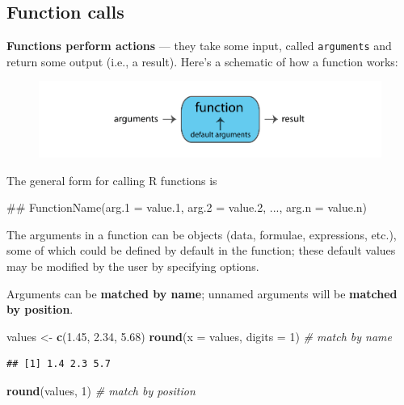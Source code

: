 \documentclass[]{book}
\newenvironment{Shaded}{\begin{snugshade}}{\end{snugshade}}
\newcommand{\KeywordTok}[1]{\textcolor[rgb]{0.13,0.29,0.53}{\textbf{#1}}}
\newcommand{\DataTypeTok}[1]{\textcolor[rgb]{0.13,0.29,0.53}{#1}}
\newcommand{\DecValTok}[1]{\textcolor[rgb]{0.00,0.00,0.81}{#1}}
\newcommand{\FloatTok}[1]{\textcolor[rgb]{0.00,0.00,0.81}{#1}}
\newcommand{\StringTok}[1]{\textcolor[rgb]{0.31,0.60,0.02}{#1}}
\newcommand{\CommentTok}[1]{\textcolor[rgb]{0.56,0.35,0.01}{\textit{#1}}}
\newcommand{\NormalTok}[1]{#1}
\begin{document}
\subsection{Function calls}\label{function-calls}

\textbf{Functions perform actions} --- they take some input, called
\texttt{arguments} and return some output (i.e., a result). Here's a
schematic of how a function works:

\begin{figure}
\centering
\includegraphics{R/Rintro/images/function.png}
\caption{}
\end{figure}

The general form for calling R functions is

\begin{Shaded}
\begin{Highlighting}[]
\NormalTok{## FunctionName(arg.1 = value.1, arg.2 = value.2, ..., arg.n = value.n)}
\end{Highlighting}
\end{Shaded}

The arguments in a function can be objects (data, formulae, expressions,
etc.), some of which could be defined by default in the function; these
default values may be modified by the user by specifying options.

Arguments can be \textbf{matched by name}; unnamed arguments will be
\textbf{matched by position}.

\begin{Shaded}
\begin{Highlighting}[]
\NormalTok{values <-}\StringTok{ }\KeywordTok{c}\NormalTok{(}\FloatTok{1.45}\NormalTok{, }\FloatTok{2.34}\NormalTok{, }\FloatTok{5.68}\NormalTok{)}
\KeywordTok{round}\NormalTok{(}\DataTypeTok{x =}\NormalTok{ values, }\DataTypeTok{digits =} \DecValTok{1}\NormalTok{) }\CommentTok{# match by name}
\end{Highlighting}
\end{Shaded}

\begin{verbatim}
## [1] 1.4 2.3 5.7
\end{verbatim}

\begin{Shaded}
\begin{Highlighting}[]
\KeywordTok{round}\NormalTok{(values, }\DecValTok{1}\NormalTok{) }\CommentTok{# match by position}
\end{Highlighting}
\end{Shaded}
\end{document}
